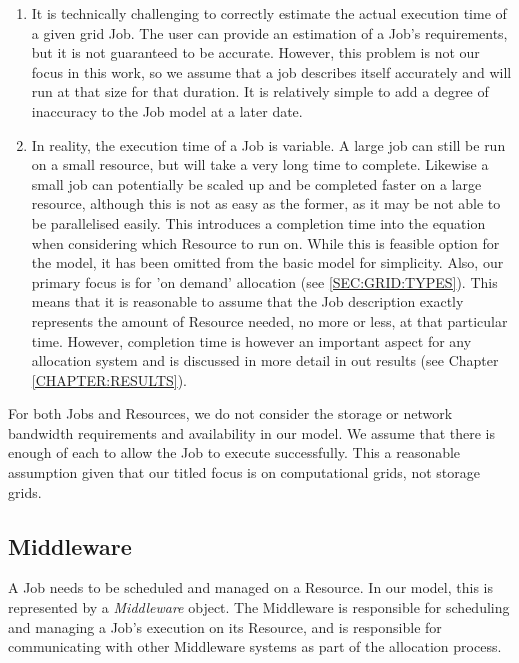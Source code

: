 \begin{enumerate} 
  
  \item It is technically challenging to correctly estimate the actual
    execution time of a given grid Job.  The user can provide an estimation of
    a Job's requirements, but it is not guaranteed to be accurate.  However,
    this problem is not our focus in this work, so we assume that a job
    describes itself accurately and will run at that size for that duration. It
    is relatively simple to add a degree of inaccuracy to the Job model at a
    later date.

  \item In reality, the execution time of a Job is variable. A large job can
    still be run on a small resource, but will take a very long time to
    complete. Likewise a small job can potentially be scaled up and be
    completed faster on a large resource, although this is not as easy as the
    former, as it may be not able to be parallelised easily. This introduces a
    completion time into the equation when considering which Resource to run
    on. While this is feasible option for the model, it has been omitted from
    the basic model for simplicity. Also, our primary focus is for 'on demand'
    allocation (see \ref{SEC:GRID:TYPES}).  This means that it is reasonable to
    assume that the Job description exactly represents the amount of Resource
    needed, no more or less, at that particular time.  However, completion time
    is however an important aspect for any allocation system and is discussed
    in more detail in out results (see Chapter \ref{CHAPTER:RESULTS}).

\end{enumerate}


For both Jobs and Resources, we do not consider the storage or network
bandwidth requirements and availability in our model. We assume that there is
enough of each to allow the Job to execute successfully. This a reasonable
assumption given that our titled focus is on computational grids, not storage
grids.

\subsection{Middleware}
\label{SEC:METHOD:MIDDLEWARE}

A Job needs to be scheduled and managed on a Resource.  In our model, this is
represented by a \textit{Middleware} object.  The Middleware is responsible for
scheduling and managing a Job's execution on its Resource, and is responsible
for communicating with other Middleware systems as part of the allocation
process. 

